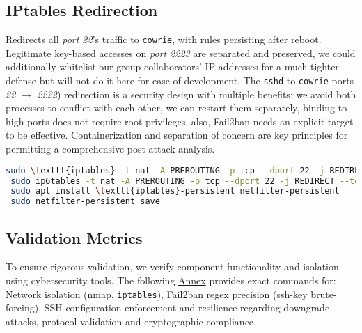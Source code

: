 \documentclass{cls/ULBreport}
\begin{document}
        \subsection{IPtables Redirection}
        Redirects all \textit{port 22}'s traffic to \texttt{cowrie}, with rules persisting after reboot. Legitimate key-based accesses on \textit{port 2223} are separated and preserved, we could additionally whitelist our group collaborators' IP addresses for a much tighter defense but will not do it here for ease of development. The \texttt{sshd} to \texttt{cowrie} {ports \textit{22}} $\rightarrow$ \textit{2222}) redirection is a security design with multiple benefits: we avoid both processes to conflict with each other, we can restart them separately, binding to high ports does not require root privileges, also, Fail2ban needs an explicit target to be effective. Containerization and separation of concern are key principles for permitting a comprehensive post-attack analysis.
        \begin{lstlisting}[language=bash,caption={Traffic Redirection to Cowrie}]
 sudo \texttt{iptables} -t nat -A PREROUTING -p tcp --dport 22 -j REDIRECT --to-port 2222
 sudo ip6tables -t nat -A PREROUTING -p tcp --dport 22 -j REDIRECT --to-port 2222
 sudo apt install \texttt{iptables}-persistent netfilter-persistent
 sudo netfilter-persistent save
        \end{lstlisting}
        


        \subsection{Validation Metrics}  
        \label{sec:validation}  
        
        To ensure rigorous validation, we verify component functionality and isolation using cybersecurity tools. The following \hyperref[annexes:network]{Annex} provides exact commands for:  Network isolation (nmap, \texttt{iptables}), Fail2ban regex precision (ssh-key brute-forcing), SSH configuration enforcement and resilience regarding downgrade attacks, protocol validation and cryptographic compliance.
        









    
\end{document}
